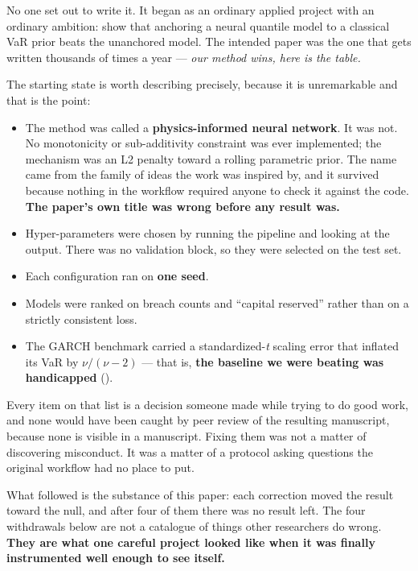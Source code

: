 No one set out to write it. It began as an ordinary applied project with an ordinary ambition:
show that anchoring a neural quantile model to a classical VaR prior beats the unanchored model.
The intended paper was the one that gets written thousands of times a year --- \emph{our method wins,
here is the table.}

The starting state is worth describing precisely, because it is unremarkable and that is the
point:

\begin{itemize}
\tightlist
\item
  The method was called a \textbf{physics-informed neural network}. It was not. No monotonicity or
  sub-additivity constraint was ever implemented; the mechanism was an L2 penalty toward a
  rolling parametric prior. The name came from the family of ideas the work was inspired by,
  and it survived because nothing in the workflow required anyone to check it against the code.
  \textbf{The paper's own title was wrong before any result was.}
\item
  Hyper-parameters were chosen by running the pipeline and looking at the output. There was no
  validation block, so they were selected on the test set.
\item
  Each configuration ran on \textbf{one seed}.
\item
  Models were ranked on breach counts and ``capital reserved'' rather than on a strictly
  consistent loss.
\item
  The GARCH benchmark carried a standardized-\emph{t} scaling error that inflated its VaR by
  \(\nu/(\nu-2)\) --- that is, \textbf{the baseline we were beating was handicapped} ().
\end{itemize}

Every item on that list is a decision someone made while trying to do good work, and none would
have been caught by peer review of the resulting manuscript, because none is visible in a
manuscript. Fixing them was not a matter of discovering misconduct. It was a matter of a
protocol asking questions the original workflow had no place to put.

What followed is the substance of this paper: each correction moved the result toward the null,
and after four of them there was no result left. The four withdrawals below are not a catalogue
of things other researchers do wrong. \textbf{They are what one careful project looked like when it was
finally instrumented well enough to see itself.}
